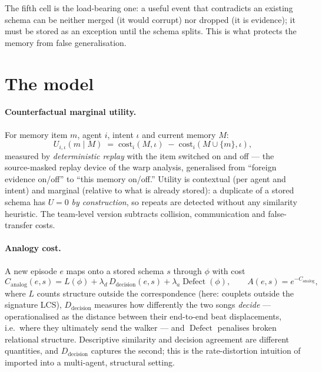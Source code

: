 \documentclass{article}
\begin{document}
The fifth cell is the load-bearing one: a useful event that
contradicts an existing schema can be neither merged (it would
corrupt) nor dropped (it is evidence); it must be stored as an
exception until the schema splits. This is what protects the memory
from false generalisation.

\section{The model}
\label{p5:sec:model}

\paragraph{Counterfactual marginal utility.} For memory item $m$,
agent $i$, intent $\iota$ and current memory $M$:
\[
U_{i,\iota}(m \mid M) \;=\;
\mathrm{cost}_i(M, \iota) \;-\; \mathrm{cost}_i(M \cup \{m\}, \iota),
\]
measured by \emph{deterministic replay} with the item switched on and
off --- the source-masked replay device of the warp analysis,
generalised from ``foreign evidence on/off'' to ``this memory
on/off.'' Utility is contextual (per agent and intent) and marginal
(relative to what is already stored): a duplicate of a stored schema
has $U = 0$ \emph{by construction}, so repeats are detected without
any similarity heuristic. The team-level version subtracts collision,
communication and false-transfer costs.

\paragraph{Analogy cost.} A new episode $e$ maps onto a stored schema
$s$ through $\phi$ with cost
\[
C_{\mathrm{analog}}(e,s) = L(\phi) + \lambda_d\,
D_{\mathrm{decision}}(e,s) + \lambda_a \operatorname{Defect}(\phi),
\qquad A(e,s) = e^{-C_{\mathrm{analog}}},
\]
where $L$ counts structure outside the correspondence (here: couplets
outside the signature LCS), $D_{\mathrm{decision}}$ measures how
differently the two songs \emph{decide} --- operationalised as the
distance between their end-to-end beat displacements, i.e.\ where
they ultimately send the walker --- and $\operatorname{Defect}$
penalises broken relational structure. Descriptive similarity and
decision agreement are different quantities, and
$D_{\mathrm{decision}}$ captures the second; this is the
rate-distortion intuition of \citet{rdd2026} imported into a
multi-agent, structural setting.
\end{document}

